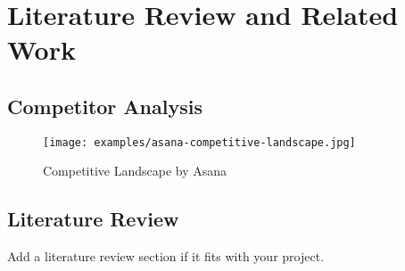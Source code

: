 \chapter{Literature Review and Related Work}
\label{chap:relatedworks}


\section{Competitor Analysis}
\label{section:competitor-analysis}

\begin{figure}[h]
    \centering
    \texttt{[image: examples/asana-competitive-landscape.jpg]}
    \caption{Competitive Landscape by Asana}
\end{figure}

\section{Literature Review}
\label{section:literature-review}

Add a literature review section if it fits with your project.